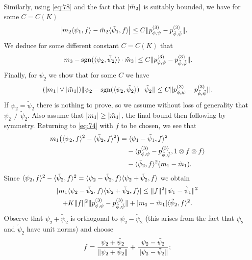 \documentclass[journal]{IEEEtran}
\newcommand{\sgn}{\mathrm{sgn}}
\newcommand{\1}{\boldsymbol{1}}
\DeclarePairedDelimiter{\Inner}{\langle}{\rangle}
\DeclarePairedDelimiter{\ip}{\langle}{\rangle}
\DeclarePairedDelimiter{\brackets}{(}{)}
\DeclarePairedDelimiter{\norm}{\lVert}{\rVert}
\DeclarePairedDelimiter{\abs}{\lvert}{\rvert}
\begin{document}
Similarly, using \cref{eq:78} and the fact that $\abs{\tilde{m}_2}$ is suitably bounded, we have for some $C=C(K)$
\begin{align*}
	\abs[\big]{ m_2\Inner{\psi_1,f} - \tilde{m}_2\Inner{\tilde{\psi}_1,f}}%
	&\leq C \norm{p_{\phi,\psi}^{(3)} - p_{\tilde{\phi},\tilde{\psi}}^{(3)}}.
\end{align*}
We deduce for some different constant $C=C(K)$ that
\begin{equation}
	\label{eq:84}
	\abs{m_3 - \sgn(\Inner{\psi_2,\tilde{\psi}_2})\cdot \tilde{m}_3}%
	\leq C \norm{p_{\phi,\psi}^{(3)} - p_{\tilde{\phi},\tilde{\psi}}^{(3)}}.
\end{equation}
Finally, for $\psi_2$ we show that for some $C$ we have
\begin{equation}
	\label{eq:49}
	(\abs{m_1}\vee\abs{\tilde{m}_1})\norm{\psi_2 - \sgn(\ip{\psi_2,\tilde{\psi}_2})\cdot\tilde{\psi}_2}%
	\leq C \norm{p_{\phi,\psi}^{(3)} - p_{\tilde{\phi},\tilde{\psi}}^{(3)}}.
\end{equation}
If $\psi_2=\tilde{\psi}_2$ there is nothing to prove, so we assume without loss of generality that $\psi_2\neq \tilde{\psi}_2$. Also assume that $\abs{m_1}\geq \abs{\tilde{m}_1}$, the final bound then following by symmetry.
Returning to \cref{eq:74} with $f$ to be chosen, we see that
\begin{align*}
	m_1\brackets[\big]{ \Inner{\psi_2,f}^2 - \Inner{\tilde{\psi}_2,f}^2}%
	&= \Inner{\psi_1 - \tilde{\psi}_1,f}^2\\%
	&\quad%
          - \Inner{p_{\phi,\psi}^{(3)} - p_{\tilde{\phi},\tilde{\psi}}^{(3)},1\otimes f\otimes f}\\%
  &\quad
	- \Inner{\tilde{\psi}_2,f}^2 \brackets{ m_1 - \tilde{m}_1}.
\end{align*}
Since
$\Inner{\psi_2,f}^2 -\Inner{\tilde{\psi}_2,f}^2 = \Inner{\psi_2 - \tilde{\psi}_2,f}\Inner{\psi_2 + \tilde{\psi}_2,f}$
we obtain
\begin{multline}
	\label{eq:86}
	\abs{m_1\Inner{\psi_2 - \tilde{\psi}_2,f}\Inner{\psi_2 + \tilde{\psi}_2,f}}%
	\leq \norm{f}^2\norm{\psi_1 - \tilde{\psi}_1}^2\\%
	+ K \norm{f}^2\norm{p_{\phi,\psi}^{(3)} - p_{\tilde{\phi},\tilde{\psi}}^{(3)}}%
	+ \abs{m_1 - \tilde{m}_1}\Inner{\tilde{\psi}_2,f}^2.
\end{multline}
Observe that $\psi_2+\tilde{\psi}_2$ is orthogonal to $\psi_2 - \tilde{\psi}_2$ (this arises from the fact that $\psi_2$ and $\tilde{\psi}_2$ have unit norms) and choose
\begin{equation*}
	f%
	= \frac{\psi_2 + \tilde{\psi}_2}{\norm{\psi_2 + \tilde{\psi}_2}} +\frac{ \psi_2 - \tilde{\psi}_2}{\norm{\psi_2 - \tilde{\psi}_2}};
\end{equation*}
\end{document}
